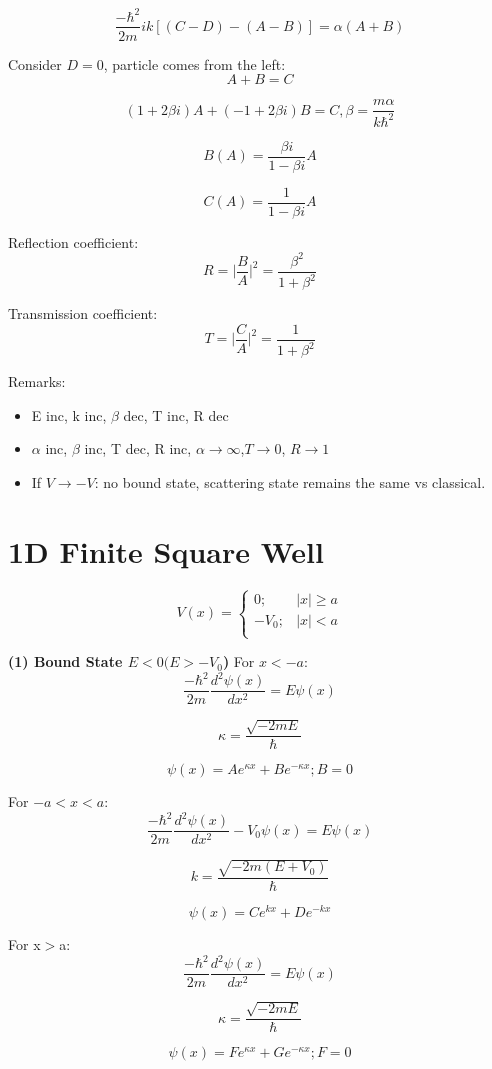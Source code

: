 \documentclass[12pt,a4paper]{article}
\begin{document}
\[
\frac{-\hbar ^2}{2m} ik[(C-D)-(A-B)]=\alpha (A+B)
\]

Consider $D=0$, particle comes from the left:
\[
A+B=C
\]

\[
(1+2\beta i)A+(-1+2\beta i)B=C, \beta=\frac{m\alpha}{k\hbar ^2}
\]

\[
B(A)=\frac{\beta i}{1-\beta i}A
\]

\[
C(A)=\frac{1}{1-\beta i}A
\]

Reflection coefficient:
\[
R=\Bigr | \frac{B}{A} \Bigr | ^2 =\frac{\beta ^2}{1+\beta^2}
\]

Transmission coefficient:
\[
T=\Bigr | \frac{C}{A} \Bigr | ^2 =\frac{1}{1+\beta^2}
\]

Remarks:
\begin{itemize}
\item E inc, k inc, $\beta$ dec, T inc, R dec
\item $\alpha$ inc, $\beta$ inc, T dec, R inc, $\alpha \to \infty$,$T \to 0$, $R \to 1$
\item If $V \to -V$: no bound state, scattering state remains the same vs classical.
\end{itemize}

\section{1D Finite Square Well}

\[ V(x)= \begin{cases} 
            0    ; & |x|\geq a \\
           -V_0  ; & |x|<a     \\
         \end{cases}
\]

\textbf{(1) Bound State $E<0 (E>-V_0$)}
For $x<-a$:
\[
\frac{-\hbar^2}{2m}\frac{d^2 \psi (x)}{dx^2}=E \psi (x)
\]

\[
\kappa=\frac{\sqrt{-2mE}}{\hbar}
\]

\[
\psi (x)= Ae^{\kappa x} + Be^{-\kappa x}; B=0
\]

For $-a<x<a$:
\[
\frac{-\hbar^2}{2m}\frac{d^2 \psi (x)}{dx^2} -V_0 \psi (x)=E \psi (x)
\]

\[
k=\frac{\sqrt{-2m(E+V_0)}}{\hbar}
\]

\[
\psi (x)= Ce^{kx} + De^{-kx}
\]

For x$>$a:
\[
\frac{-\hbar^2}{2m}\frac{d^2 \psi (x)}{dx^2}=E \psi (x)
\]

\[
\kappa =\frac{\sqrt{-2mE}}{\hbar}
\]

\[
\psi (x)= Fe^{\kappa x} + Ge^{-\kappa x}; F=0
\]
\end{document}
